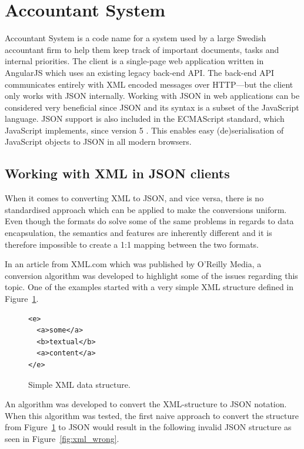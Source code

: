 \documentclass{cslthse-msc}
\begin{document}
\section{Accountant System}

Accountant System is a code name for a system used by a large Swedish accountant firm to help them keep track of important documents, tasks and internal priorities. The client is a single-page web application written in AngularJS which uses an existing legacy back-end API. The back-end API communicates entirely with XML encoded messages over HTTP---but the client only works with JSON internally. Working with JSON in web applications can be considered very beneficial since JSON and its syntax is a subset of the JavaScript language. JSON support is also included in the ECMAScript standard, which JavaScript implements, since version 5 \cite{ecmascript_5}. This enables easy (de)serialisation of JavaScript objects to JSON in all modern browsers.

\subsection{Working with XML in JSON clients}
\label{xml_json}

When it comes to converting XML to JSON, and vice versa, there is no standardised approach which can be applied to make the conversions uniform. Even though the formats do solve some of the same problems in regards to data encapsulation, the semantics and features are inherently different and it is therefore impossible to create a 1:1 mapping between the two formats.

In an article from XML.com \cite{xml_json} which was published by O'Reilly Media, a conversion algorithm was developed to highlight some of the issues regarding this topic. One of the examples started with a very simple XML structure defined in Figure~\ref{fig:xml_structure}.

\begin{figure}[H]
  \centering
    \begin{center}
\begin{lstlisting}[breaklines=true,frame=single]
<e>
  <a>some</a>
  <b>textual</b>
  <a>content</a>
</e>
\end{lstlisting}
    \end{center}
  \caption{Simple XML data structure.}
  \label{fig:xml_structure}
\end{figure}

An algorithm was developed to convert the XML-structure to JSON notation. When this algorithm was tested, the first naive approach to convert the structure from Figure~\ref{fig:xml_structure} to JSON would result in the following invalid JSON structure as seen in Figure~\ref{fig:xml_wrong}.
\end{document}
